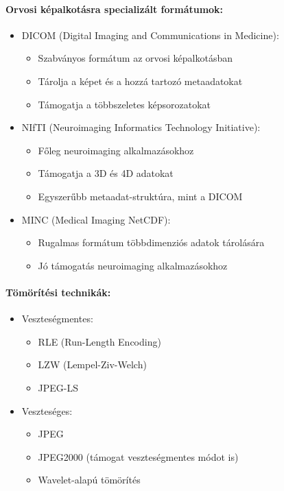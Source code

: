 \documentclass[a4paper,12pt]{article}
\begin{document}
\paragraph{Orvosi képalkotásra specializált formátumok:} \begin{itemize} \item DICOM (Digital Imaging and Communications in Medicine): \begin{itemize} \item Szabványos formátum az orvosi képalkotásban \item Tárolja a képet és a hozzá tartozó metaadatokat \item Támogatja a többszeletes képsorozatokat \end{itemize} \item NIfTI (Neuroimaging Informatics Technology Initiative): \begin{itemize} \item Főleg neuroimaging alkalmazásokhoz \item Támogatja a 3D és 4D adatokat \item Egyszerűbb metaadat-struktúra, mint a DICOM \end{itemize} \item MINC (Medical Imaging NetCDF): \begin{itemize} \item Rugalmas formátum többdimenziós adatok tárolására \item Jó támogatás neuroimaging alkalmazásokhoz \end{itemize} \end{itemize}

\paragraph{Tömörítési technikák:} \begin{itemize} \item Veszteségmentes: \begin{itemize} \item RLE (Run-Length Encoding) \item LZW (Lempel-Ziv-Welch) \item JPEG-LS \end{itemize} \item Veszteséges: \begin{itemize} \item JPEG \item JPEG2000 (támogat veszteségmentes módot is) \item Wavelet-alapú tömörítés \end{itemize} \end{itemize}
\end{document}
